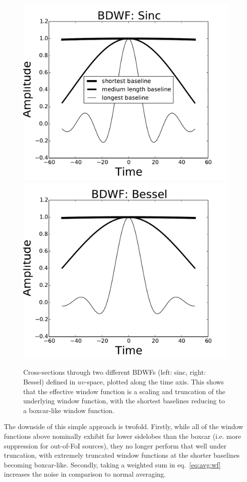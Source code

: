 \documentclass[useAMS,usenatbib]{mn2e}
\newcommand{\OMS}[1]{\textcolor{red}{{\bf OMS: #1}}}
\newcommand{\ATM}[1]{\textcolor{blue}{{\bf Marcellin: #1}}}
\newcommand{\GSF}[1]{\textcolor{red}{{\bf GSF: #1}}}
\begin{document}
\begin{figure}%
\includegraphics[width=.4\textwidth]{./Figures/sinc-baseline_longMidShortshortgrey.pdf}%
\includegraphics[width=.4\textwidth]{./Figures/bessel-baseline_longMidShortshortgrey.pdf}
\caption{Cross-sections through two different BDWFs (left: sinc, right: Bessel) defined in $uv$-space, 
plotted along the time axis. This shows that the effective window function is a scaling and truncation of the underlying window function, with
the shortest baselines reducing to a boxcar-like window function.
}
\label{fig:WF:perbaseline}
\end{figure}

The downside of this simple approach is twofold. Firstly, while all of the window functions above nominally exhibit far lower 
sidelobes than the boxcar
(i.e. more suppression for out-of-FoI sources), they no longer perform that well under truncation, 
with extremely truncated window functions 
at the shorter baselines becoming boxcar-like. Secondly, taking a weighted sum in eq.~\ref{eq:avg:wf} increases 
the noise in comparison to normal averaging.
\end{document}
